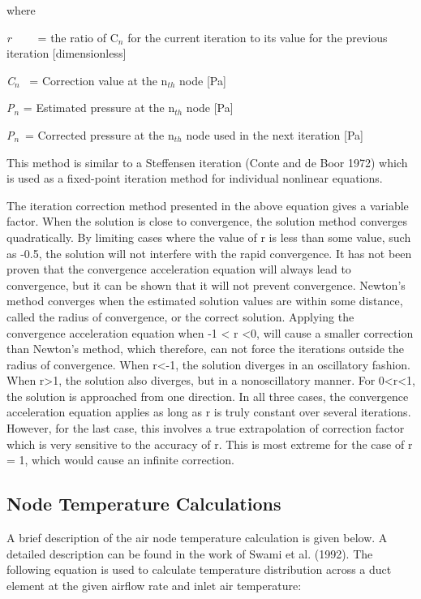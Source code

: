 where

\emph{r}~~~~ = the ratio of C\(_{n}\) for the current iteration to its value for the previous iteration {[}dimensionless{]}

\emph{C\(_{n}\)}~ = Correction value at the n\(_{th}\) node {[}Pa{]}

\emph{P\(_{n}\)} = Estimated pressure at the n\(_{th}\) node {[}Pa{]}

\emph{P\(_{n}\)\(^{\*}\)} = Corrected pressure at the n\(_{th}\) node used in the next iteration {[}Pa{]}

This method is similar to a Steffensen iteration (Conte and de Boor 1972) which is used as a fixed-point iteration method for individual nonlinear equations.

The iteration correction method presented in the above equation gives a variable factor. When the solution is close to convergence, the solution method converges quadratically. By limiting cases where the value of r is less than some value, such as -0.5, the solution will not interfere with the rapid convergence. It has not been proven that the convergence acceleration equation will always lead to convergence, but it can be shown that it will not prevent convergence. Newton's method converges when the estimated solution values are within some distance, called the radius of convergence, or the correct solution. Applying the convergence acceleration equation when -1 \textless{} r \textless{}0, will cause a smaller correction than Newton's method, which therefore, can not force the iterations outside the radius of convergence. When r\textless{}-1, the solution diverges in an oscillatory fashion. When r\textgreater{}1, the solution also diverges, but in a nonoscillatory manner. For 0\textless{}r\textless{}1, the solution is approached from one direction. In all three cases, the convergence acceleration equation applies as long as r is truly constant over several iterations. However, for the last case, this involves a true extrapolation of correction factor which is very sensitive to the accuracy of r. This is most extreme for the case of r = 1, which would cause an infinite correction.

\subsection{Node Temperature Calculations}\label{node-temperature-calculations}

A brief description of the air node temperature calculation is given below. A detailed description can be found in the work of Swami et al. (1992). The following equation is used to calculate temperature distribution across a duct element at the given airflow rate and inlet air temperature:


